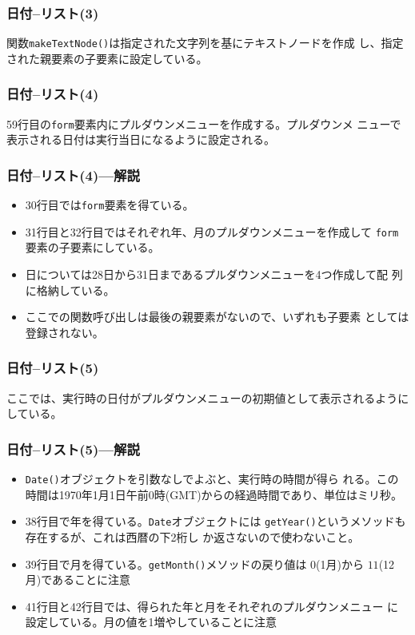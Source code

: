\begin{frame}[containsverbatim]
\frametitle{日付--リスト(3)}
関数\texttt{makeTextNode()}は指定された文字列を基にテキストノードを作成
 し、指定された親要素の子要素に設定している。
\end{frame}
\begin{frame}[containsverbatim]
\frametitle{日付--リスト(4)}
59行目の\texttt{form}要素内にプルダウンメニューを作成する。プルダウンメ
 ニューで表示される日付は実行当日になるように設定される。
\end{frame}
\begin{frame}[containsverbatim]
\frametitle{日付--リスト(4)---解説}
\begin{itemize}
 \item 30行目では\texttt{form}要素を得ている。
 \item 31行目と32行目ではそれぞれ年、月のプルダウンメニューを作成して
       \texttt{form}要素の子要素にしている。
 \item 日については28日から31日まであるプルダウンメニューを4つ作成して配
       列に格納している。
 \item ここでの関数呼び出しは最後の親要素がないので、いずれも子要素
       としては登録されない。
\end{itemize}
\end{frame}
\begin{frame}[containsverbatim]
\frametitle{日付--リスト(5)}
ここでは、実行時の日付がプルダウンメニューの初期値として表示されるように
 している。
\end{frame}
\begin{frame}[containsverbatim]
\frametitle{日付--リスト(5)---解説}
\begin{itemize}
 \item \texttt{Date()}オブジェクトを引数なしでよぶと、実行時の時間が得ら
       れる。この時間は1970年1月1日午前0時(GMT)からの経過時間であり、単位はミリ秒。
 \item 38行目で年を得ている。\texttt{Date}オブジェクトには
       \texttt{getYear()}というメソッドも存在するが、これは西暦の下2桁し
       か返さないので使わないこと。
 \item 39行目で月を得ている。\texttt{getMonth()}メソッドの戻り値は
       $0$(1月)から $11$(12月)であることに注意
 \item 41行目と42行目では、得られた年と月をそれぞれのプルダウンメニュー
       に設定している。月の値を1増やしていることに注意
\end{itemize}
\end{frame}
